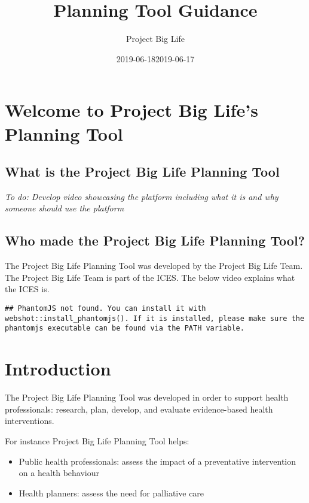 \documentclass[]{book}
\title{Planning Tool Guidance}
\author{Project Big Life}
\date{2019-06-18}
\date{2019-06-17}
\providecommand{\tightlist}{%
  \setlength{\itemsep}{0pt}\setlength{\parskip}{0pt}}
\begin{document}
\maketitle

{
\setcounter{tocdepth}{1}
\tableofcontents
}
\chapter{Welcome to Project Big Life's Planning
Tool}\label{welcome-to-project-big-lifes-planning-tool}

\section{What is the Project Big Life Planning
Tool}\label{what-is-the-project-big-life-planning-tool}

\emph{To do: Develop video showcasing the platform including what it is
and why someone should use the platform}

\section{Who made the Project Big Life Planning
Tool?}\label{who-made-the-project-big-life-planning-tool}

The Project Big Life Planning Tool was developed by the Project Big Life
Team. The Project Big Life Team is part of the ICES. The below video
explains what the ICES is.

\begin{verbatim}
## PhantomJS not found. You can install it with webshot::install_phantomjs(). If it is installed, please make sure the phantomjs executable can be found via the PATH variable.
\end{verbatim}

\chapter{Introduction}\label{introduction}

The Project Big Life Planning Tool was developed in order to support
health professionals: research, plan, develop, and evaluate
evidence-based health interventions.

For instance Project Big Life Planning Tool helps:

\begin{itemize}
\tightlist
\item
  Public health professionals: assess the impact of a preventative
  intervention on a health behaviour
\item
  Health planners: assess the need for palliative care
\end{itemize}
\end{document}

